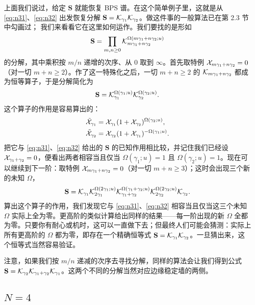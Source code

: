 上面我们说过，给定 $\mathbf S$ 就能恢复 BPS 谱。在这个简单例子里，这就是从 \eqref{eq:n31}、\eqref{eq:n32} 出发恢复分解 $\mathbf S=\mathcal{K}_{\gamma_1}\mathcal{K}_{\gamma_2}$。做这件事的一般算法已在第 2.3 节中勾画过；%
我们来看看它在这里如何运作。我们要找的是形如
\begin{equation}
\mathbf S=\prod_{m,n\ge0}\mathcal{K}_{m\gamma_1+n\gamma_2}^{\Omega(m\gamma_1+n\gamma_2;u)}
\end{equation}
的分解，其中乘积按 $m/n$ 递增的次序、从 $0$ 取到 $\infty$。首先取特例 $\mathcal{X}_{m\gamma_1+n\gamma_2}=0$（对一切 $m+n\ge2$）。作了这一特殊化之后，一切 $m+n\ge2$ 的 $\mathcal{K}_{m\gamma_1+n\gamma_2}$ 都成为恒等算子，于是分解简化为
\begin{equation}
\mathbf S=\mathcal{K}_{\gamma_1}^{\Omega(\gamma_1;u)}\mathcal{K}_{\gamma_2}^{\Omega(\gamma_2;u)}.
\end{equation}
这个算子的作用是容易算出的：
\begin{align}
\tilde{\mathcal{X}}_{\gamma_1}&=\mathcal{X}_{\gamma_1}(1+\mathcal{X}_{\gamma_2})^{\Omega(\gamma_2;u)},\\
\tilde{\mathcal{X}}_{\gamma_2}&=\mathcal{X}_{\gamma_2}(1+\mathcal{X}_{\gamma_1})^{-\Omega(\gamma_1;u)}.
\end{align}
把它与 \eqref{eq:n31}、\eqref{eq:n32} 给出的 $\mathbf S$ 的已知作用相比较，并记住我们已经设 $\mathcal{X}_{\gamma_1+\gamma_2}=0$，便看出两者相容当且仅当 $\Omega(\gamma_1;u)=1$ 且 $\Omega(\gamma_2;u)=1$。现在可以继续到下一阶：取特例 $\mathcal{X}_{m\gamma_1+n\gamma_2}=0$（对一切 $m+n\ge3$）；这时会出现三个新的未知 $\Omega$，
\begin{equation}
\mathbf S=\mathcal{K}_{\gamma_1}\mathcal{K}_{2\gamma_1}^{\Omega(2\gamma_1;u)}\mathcal{K}_{\gamma_1+\gamma_2}^{\Omega(\gamma_1+\gamma_2;u)}\mathcal{K}_{2\gamma_2}^{\Omega(2\gamma_2;u)}\mathcal{K}_{\gamma_2}.
\end{equation}
算出这个算子的作用，我们发现它与 \eqref{eq:n31}、\eqref{eq:n32} 相容当且仅当这三个未知 $\Omega$ 实际上全为零。更高阶的类似计算给出同样的结果——每一阶出现的新 $\Omega$ 全都为零。只要你有耐心或机时，这可以一直做下去；但最终人们可能会猜测：实际上所有更高阶的 $\Omega$ 都为零，即存在一个精确恒等式 $\mathbf S=\mathcal{K}_{\gamma_1}\mathcal{K}_{\gamma_2}$。一旦猜出来，这个恒等式当然容易验证。

注意，如果我们按 $m/n$ 递减的次序去寻找分解，同样的算法会让我们得到公式 $\mathbf S=\mathcal{K}_{\gamma_2}\mathcal{K}_{\gamma_1+\gamma_2}\mathcal{K}_{\gamma_1}$。这两个不同的分解当然对应边缘稳定墙的两侧。

\subsection{$N=4$}

